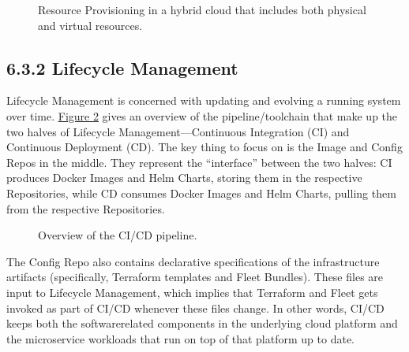 \documentclass[a4paper,11pt,english]{sphinxmanual}
\let\sphinxpxdimen\pdfpxdimen\else\newdimen\sphinxpxdimen
\begin{document}
\begin{figure}[ht]
\centering
\capstart

\noindent\sphinxincludegraphics[width=450\sphinxpxdimen]{{Slide121}.png}
\caption{Resource Provisioning in a hybrid cloud that includes both
physical and virtual resources.}\label{\detokenize{cloud:id6}}\label{\detokenize{cloud:fig-infra}}\end{figure}


\subsection{6.3.2 Lifecycle Management}
\label{\detokenize{cloud:lifecycle-management}}
\sphinxAtStartPar
Lifecycle Management is concerned with updating and evolving a running
system over time. \hyperref[\detokenize{cloud:fig-cicd}]{Figure \ref{\detokenize{cloud:fig-cicd}}} gives an overview of
the pipeline/toolchain that make up the two halves of Lifecycle
Management—Continuous Integration (CI) and Continuous Deployment
(CD). The key thing to focus on is the Image and Config Repos in the
middle. They represent the “interface” between the two halves: CI
produces Docker Images and Helm Charts, storing them in the respective
Repositories, while CD consumes Docker Images and Helm Charts, pulling
them from the respective Repositories.

\begin{figure}[ht]
\centering
\capstart

\noindent\sphinxincludegraphics[width=600\sphinxpxdimen]{{Slide81}.png}
\caption{Overview of the CI/CD pipeline.}\label{\detokenize{cloud:id7}}\label{\detokenize{cloud:fig-cicd}}\end{figure}

\sphinxAtStartPar
The Config Repo also contains declarative specifications of the
infrastructure artifacts (specifically, Terraform templates and Fleet
Bundles). These files are input to Lifecycle Management, which implies
that Terraform and Fleet gets invoked as part of CI/CD whenever these
files change. In other words, CI/CD keeps both the software\sphinxhyphen{}related
components in the underlying cloud platform and the microservice
workloads that run on top of that platform up to date.
\end{document}
